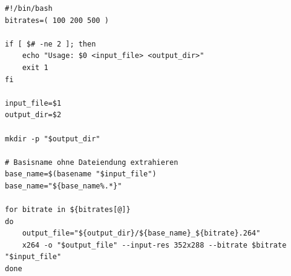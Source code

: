 \documentclass[a4paper,12pt]{article}
\begin{document}
\captionsetup{type=listing}
\begin{verbatim}
#!/bin/bash
bitrates=( 100 200 500 )

if [ $# -ne 2 ]; then
	echo "Usage: $0 <input_file> <output_dir>"
	exit 1
fi

input_file=$1
output_dir=$2

mkdir -p "$output_dir"

# Basisname ohne Dateiendung extrahieren
base_name=$(basename "$input_file")
base_name="${base_name%.*}"

for bitrate in ${bitrates[@]}
do
	output_file="${output_dir}/${base_name}_${bitrate}.264"
	x264 -o "$output_file" --input-res 352x288 --bitrate $bitrate "$input_file"
done
\end{verbatim}
\label{lst:bashscript_x264_bitrates}
\vspace{10pt}

\newpage
\printbibliography
\end{document}
